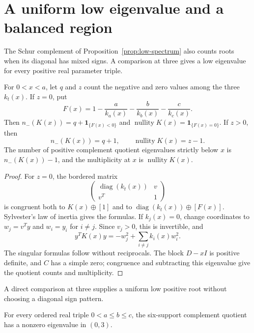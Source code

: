 \section{A uniform low eigenvalue and a balanced region}
\label{sec:mixed-inertia}

The Schur complement of Proposition~\ref{prop:low-spectrum} also
counts roots when its diagonal has mixed signs. A comparison at three
gives a low eigenvalue for every positive real parameter triple.

\begin{samepage}
\begin{lemma}
\label{lem:mixed-inertia}
For $0<x<a$, let $q$ and $z$ count the negative and zero values among
the three $k_t(x)$. If $z=0$, put
\[
F(x)=1-\frac{a}{k_a(x)}-\frac{b}{k_b(x)}-\frac{c}{k_c(x)}.
\]
Then $n_-(K(x))=q+\mathbf1_{\{F(x)<0\}}$ and
$\operatorname{nullity}K(x)=\mathbf1_{\{F(x)=0\}}$.
If $z>0$, then
\[
n_-(K(x))=q+1,\qquad \operatorname{nullity}K(x)=z-1.
\]
The number of positive complement quotient eigenvalues strictly below
$x$ is $n_-(K(x))-1$, and the multiplicity at $x$ is
$\operatorname{nullity}K(x)$.
\end{lemma}
\end{samepage}

\begin{proof}
For $z=0$, the bordered matrix
\[
\begin{pmatrix}\operatorname{diag}(k_t(x))&v\\v^T&1\end{pmatrix}
\]
is congruent both to $K(x)\oplus[1]$ and to
$\operatorname{diag}(k_t(x))\oplus[F(x)]$. Sylvester's law of inertia
gives the formulas. If $k_j(x)=0$, change coordinates to
$w_j=v^Ty$ and $w_i=y_i$ for $i\ne j$. Since $v_j>0$, this is
invertible, and
\[
y^TK(x)y=-w_j^2+\sum_{i\ne j}k_i(x)w_i^2.
\]
The singular formulas follow without reciprocals. The block $D-xI$
is positive definite, and $C$ has a simple zero; congruence and
subtracting this eigenvalue give the quotient counts and multiplicity.
\end{proof}

A direct comparison at three supplies a uniform low positive root
without choosing a diagonal sign pattern.

\begin{theorem}
\label{thm:uniform-low-root}
For every ordered real triple $0<a\leq b\leq c$, the six-support
complement quotient has a nonzero eigenvalue in $(0,3)$.
\end{theorem}

